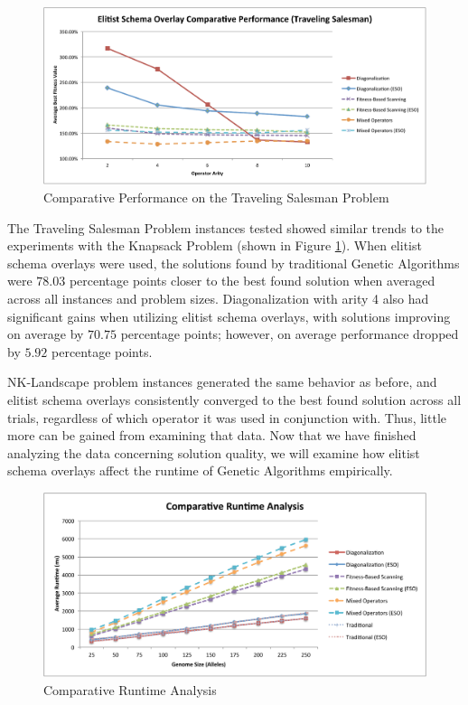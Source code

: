 \begin{figure}[htbp!]
\centering
\includegraphics[scale=0.55]{charts/Both_TSP.pdf}
\caption{Comparative Performance on the Traveling Salesman Problem}
\label{fig:both_tsp}
\end{figure}

The Traveling Salesman Problem instances tested showed similar trends to the experiments with the Knapsack Problem (shown in Figure \ref{fig:both_tsp}). When elitist schema overlays were used, the solutions found by traditional Genetic Algorithms were $78.03$ percentage points closer to the best found solution when averaged across all instances and problem sizes. Diagonalization with arity 4 also had significant gains when utilizing elitist schema overlays, with solutions improving on average by $70.75$ percentage points; however, on average performance dropped by $5.92$ percentage points.


NK-Landscape problem instances generated the same behavior as before, and elitist schema overlays consistently converged to the best found solution across all trials, regardless of which operator it was used in conjunction with. Thus, little more can be gained from examining that data. Now that we have finished analyzing the data concerning solution quality, we will examine how elitist schema overlays affect the runtime of Genetic Algorithms empirically. 

\begin{figure}[htbp!]
\centering
\includegraphics[scale=0.55]{charts/Runtime.pdf}
\caption{Comparative Runtime Analysis}
\label{fig:runtime}
\end{figure}

